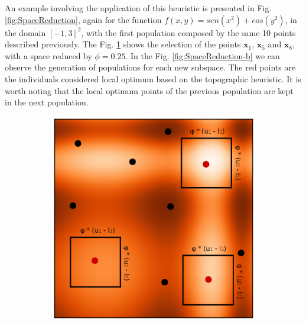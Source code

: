 An example involving the application of this heuristic is presented in Fig. \ref{fig:SpaceReduction}, again for the function $f(x, y) = sen(x^2) + cos(y^2)$, in the domain $[-1, 3]^2$, with the first population composed by the same 10 points described previously. The Fig. \ref{fig:SpaceReduction-a} shows the selection of the points $\bm{x}_1$, $\bm{x}_5$ and $\bm{x}_8$, with a space reduced by $\phi = 0.25$. In the Fig. \ref{fig:SpaceReduction-b} we can observe the generation of populations for each new subspace. The red points are the individuals considered local optimum based on the topographic heuristic. It is worth noting that the local optimum points of the previous population are kept in the next population.


\begin{figure}[tp]
\centering
\begin{subfigure}{.5\textwidth}
  \centering
  \includegraphics[width=1.1\linewidth]{fig_2.eps}
  \caption{}
  \label{fig:SpaceReduction-a}
\end{subfigure}%
\begin{subfigure}{.5\textwidth}
  \centering

\end{subfigure}
\end{figure}

